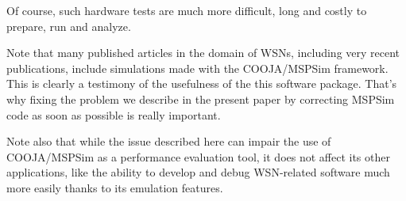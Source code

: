 \documentclass[10pt,final,journal,twocolumn]{IEEEtran}
\begin{document}
Of course, such hardware tests are much more difficult, long and
costly to prepare, run and analyze.

Note that many published articles in the domain of WSNs, including
very recent publications, include simulations made with the COOJA/MSPSim
framework. This is clearly a testimony of the usefulness of the this
software package. That's why fixing the problem we describe in the present
paper by correcting MSPSim code as soon as possible is really important.

Note also that while the issue described here can impair the use of
COOJA/MSPSim as a performance evaluation tool, it does not affect its other
applications, like the ability to develop and debug WSN-related software much
more easily thanks to its emulation features.




{\small
}
\end{document}
